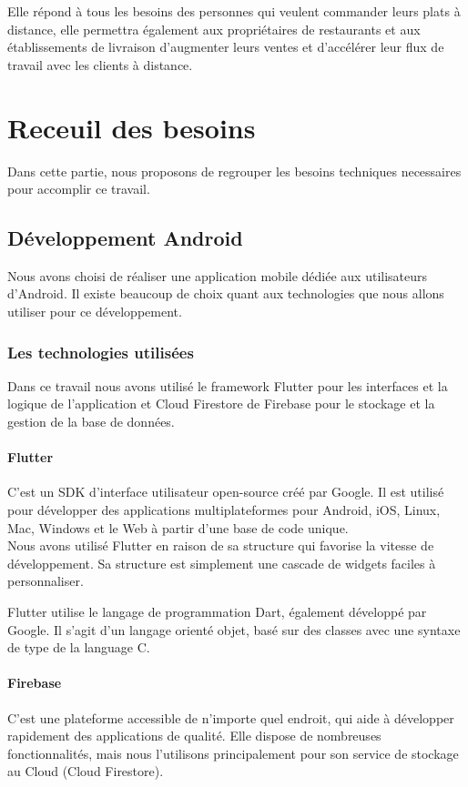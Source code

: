 \documentclass[french, a4paper, 12pt]{report}
\begin{document}
Elle répond à tous les besoins des personnes qui veulent commander leurs plats à distance, elle permettra également aux propriétaires de restaurants et aux établissements de livraison d'augmenter leurs ventes et d'accélérer leur flux de travail avec les clients à distance.


\newpage
\chapter{Receuil des besoins} Dans cette partie, nous proposons de regrouper les besoins techniques necessaires pour accomplir ce travail.
	\section{Développement Android} Nous avons choisi de réaliser une application mobile dédiée aux utilisateurs d'Android. Il existe beaucoup de choix quant aux technologies que nous allons utiliser pour ce développement.
		\subsection{Les technologies utilisées} Dans ce travail nous avons utilisé le framework Flutter pour les interfaces et la logique de l'application et Cloud Firestore de Firebase pour le stockage et la gestion de la base de données.
			\subsubsection*{Flutter} C'est un SDK d'interface utilisateur open-source créé par Google. Il est utilisé pour développer des applications multiplateformes pour Android, iOS, Linux, Mac, Windows et le Web à partir d'une base de code unique.\\Nous avons utilisé Flutter en raison de sa structure qui favorise la vitesse de développement. Sa structure est simplement une cascade de widgets faciles à personnaliser.

Flutter utilise le langage de programmation Dart, également développé par Google. Il s'agit d'un langage orienté objet, basé sur des classes avec une syntaxe de type de la language C.
			\subsubsection*{Firebase} C'est une plateforme accessible de n'importe quel endroit, qui aide à développer rapidement des applications de qualité. Elle dispose de nombreuses fonctionnalités, mais nous l'utilisons principalement pour son service de stockage au Cloud (Cloud Firestore).\\
\end{document}
